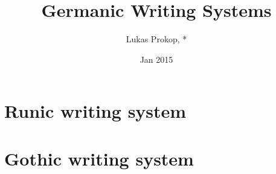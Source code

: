 \documentclass[a4paper]{article}
\author{Lukas Prokop, *}
\title{Germanic Writing Systems}
\date{Jan 2015}
\begin{document}
\maketitle
\tableofcontents

\section{Runic writing system}

\section{Gothic writing system}
\end{document}
